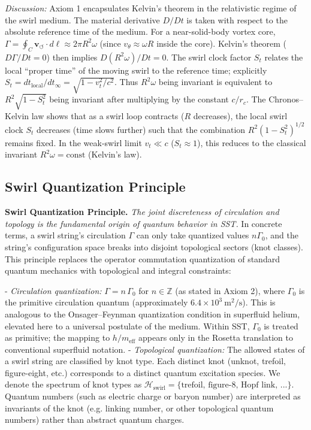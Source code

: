 \documentclass[10pt,reprint,aps,onecolumn,nofootinbib]{revtex4-2}
\newcommand{\vswirl}{\mathbf{v}_{\!\boldsymbol{\circlearrowleft}}}
\begin{document}
    \noindent \textit{Discussion:} Axiom 1 encapsulates Kelvin’s theorem in the relativistic regime of the swirl medium. The material derivative $D/Dt$ is taken with respect to the absolute reference time of the medium. For a near-solid-body vortex core, $\Gamma = \oint_C \vswirl\cdot d\ell \approx 2\pi R^2 \omega$ (since $v_{\theta}\approx \omega R$ inside the core). Kelvin’s theorem ($D\Gamma/Dt=0$) then implies $D(R^2 \omega)/Dt=0$. The swirl clock factor $S_t$ relates the local “proper time” of the moving swirl to the reference time; explicitly $S_t = dt_{\text{local}}/dt_{\infty} = \sqrt{1 - v_t^2/c^2}$. Thus $R^2 \omega$ being invariant is equivalent to $R^2 \sqrt{1 - S_t^2}$ being invariant after multiplying by the constant $c/r_c$. The Chronos–Kelvin law shows that as a swirl loop contracts ($R$ decreases), the local swirl clock $S_t$ decreases (time slows further) such that the combination $R^2 (1-S_t^2)^{1/2}$ remains fixed. In the weak-swirl limit $v_t \ll c$ ($S_t\approx 1$), this reduces to the classical invariant $R^2 \omega = \text{const}$ (Kelvin’s law).


    \subsection*{Swirl Quantization Principle}
        \textbf{Swirl Quantization Principle.} \emph{The joint discreteness of circulation and topology is the fundamental origin of quantum behavior in SST.} In concrete terms, a swirl string's circulation $\Gamma$ can only take quantized values $n\Gamma_0$, and the string's configuration space breaks into disjoint topological sectors (knot classes). This principle replaces the operator commutation quantization of standard quantum mechanics with topological and integral constraints:

        - \emph{Circulation quantization:} $\Gamma = n\,\Gamma_0$ for $n\in\mathbb{Z}$ (as stated in Axiom 2), where $\Gamma_0$ is the primitive circulation quantum (approximately $6.4\times 10^{3}~\mathrm{m^2/s}$). This is analogous to the Onsager–Feynman quantization condition in superfluid helium, elevated here to a universal postulate of the medium. Within SST, $\Gamma_0$ is treated as primitive; the mapping to $h/m_{\text{eff}}$ appears only in the Rosetta translation to conventional superfluid notation.
        - \emph{Topological quantization:} The allowed states of a swirl string are classified by knot type. Each distinct knot (unknot, trefoil, figure-eight, etc.) corresponds to a distinct quantum excitation species. We denote the spectrum of knot types as $\mathcal{H}_{\text{swirl}} = \{\text{trefoil, figure-8, Hopf link, ...}\}$. Quantum numbers (such as electric charge or baryon number) are interpreted as invariants of the knot (e.g. linking number, or other topological quantum numbers) rather than abstract quantum charges.
\end{document}
